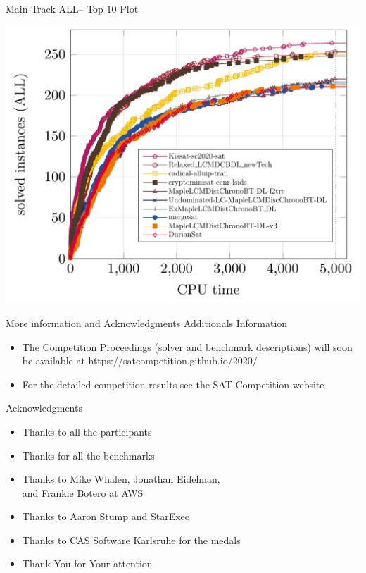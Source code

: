 \documentclass{beamer}
\begin{document}
\begin{frame}{Main Track ALL-- Top 10 Plot}

\centering
\includegraphics[width=.8\textwidth]{main-top10-ALL}

\end{frame}




\begin{frame}{More information and Acknowledgments}
Additionals Information
\begin{itemize}
	\item The Competition Proceedings (solver and benchmark descriptions)
	 will soon be available at https://satcompetition.github.io/2020/
	\item For the detailed competition results see the SAT Competition website
\end{itemize}
\medskip

Acknowledgments
\begin{itemize}
\item Thanks to all the participants
\item Thanks for all the benchmarks
\item Thanks to Mike Whalen, Jonathan Eidelman,\\and Frankie Botero at AWS
\item Thanks to Aaron Stump and StarExec
\item Thanks to CAS Software Karlsruhe for the medals
\end{itemize}
\begin{itemize}
\item Thank You for Your attention
\end{itemize}
\end{frame}


\end{document}
